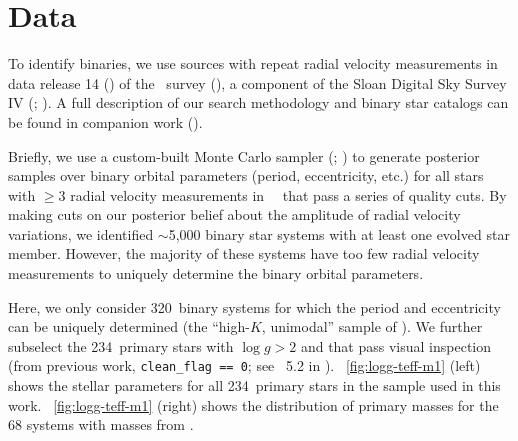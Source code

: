 \documentclass[modern, letterpaper]{aastex62}
\newcommand{\apogee}{\project{\acronym{APOGEE}}}
\newcommand{\sdssiv}{\project{\acronym{SDSS-IV}}}
\newcommand{\DR}{\acronym{DR14}}
\newcommand{\logg}{\ensuremath{\log g}}
\newcommand{\nunimodal}{320}
\newcommand{\nclean}{234}
\begin{document}

\section{Data} \label{sec:data}

To identify binaries, we use sources with repeat radial velocity measurements in
data release 14 (\DR) of the \apogee\ survey
(\citealt{Majewski:2017,Abolfathi:2017}), a component of the Sloan Digital Sky
Survey IV (\sdssiv; \citealt{Gunn:2006,Blanton:2017}).
A full description of our search methodology and binary star catalogs can be
found in companion work (\citealt{Price-Whelan:2018}).

Briefly, we use a custom-built Monte Carlo sampler (;
\citealt{Price-Whelan:2017}) to generate posterior samples over binary orbital
parameters (period, eccentricity, etc.) for all stars with $\geq 3$ radial
velocity measurements in \apogee\ \DR\ that pass a series of quality cuts.
By making cuts on our posterior belief about the amplitude of radial velocity
variations, we identified $\sim$5,000 binary star systems with at least one
evolved star member.
However, the majority of these systems have too few radial velocity measurements
to uniquely determine the binary orbital parameters.

Here, we only consider \nunimodal\ binary systems for which the period and
eccentricity can be uniquely determined (the ``high-$K$, unimodal'' sample of
\citealt{Price-Whelan:2018}).
We further subselect the \nclean\ primary stars with $\logg > 2$ and that pass
visual inspection (from previous work, \texttt{clean\_flag == 0}; see
\sectionname~5.2 in \citealt{Price-Whelan:2018}).
\figurename~\ref{fig:logg-teff-m1} (left) shows the stellar parameters for all
\nclean\ primary stars in the sample used in this work.
\figurename~\ref{fig:logg-teff-m1} (right) shows the distribution of primary
masses for the 68 systems with masses from \cite{Ness:2015}.
\end{document}
